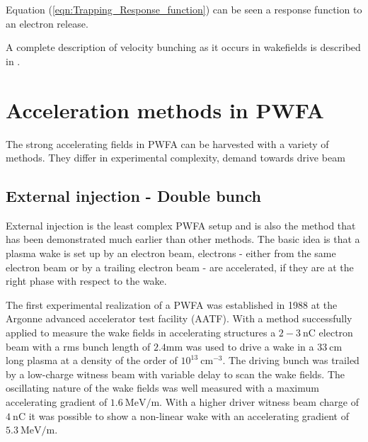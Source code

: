 Equation (\ref{eqn:Trapping_Response_function}) can be seen a response function to an electron release. 



A complete description of velocity bunching as it occurs in wakefields is described in
\cite{AndersonVelocBunchPPRSTAB2005,serafini2001velocity}.

\section{Acceleration methods in PWFA}
The strong accelerating fields in PWFA can be harvested with a variety of methods. They differ in experimental complexity, demand towards drive beam 



\subsection{External injection - Double bunch}
External injection is the least complex PWFA setup and is also the method that has been demonstrated much earlier than other methods. The basic idea is that a plasma wake is set up by an electron beam, electrons - either from the same electron beam or by a trailing electron beam - are accelerated, if they are at the right phase with respect to the wake.

The first experimental realization of a PWFA was established in 1988 at the Argonne advanced accelerator test facility (AATF)\cite{rosenzweig1988experimental}. With a method successfully applied to measure the wake fields in accelerating structures
a $2-3\ \mathrm{nC}$ electron beam with a rms bunch length of $2.4 \mathrm{mm}$ was used to drive a wake in a $33\ \mathrm{cm} $ long plasma at a density of the order of $ 10^{13}\ \mathrm{cm}^{-3}$. The driving bunch was trailed by a low-charge witness beam with variable delay to scan the wake fields.
The oscillating nature of the wake fields was well measured with a maximum accelerating gradient of $1.6\ \mathrm{MeV/m}$. 
With a higher driver witness beam charge of $4\ \mathrm{nC}$ \cite{figueroa1988direct} it was possible to show a non-linear wake with an accelerating gradient of $5.3\ \mathrm{MeV/m}$. 

